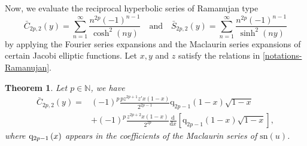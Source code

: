 \documentclass[11pt]{article}
\theoremstyle{plain}
\newtheorem{thm}{Theorem}[section]
\theoremstyle{definition}
\begin{document}
Now, we evaluate the  reciprocal hyperbolic series of Ramanujan type
$$
\bar{C}_{2p,2}\left( y \right)=\sum_{n=1}^{\infty}{\frac{n^{2p}\left( -1 \right) ^{n-1}}{\cosh ^2\left( ny \right)}}\quad\text{and}\quad\bar{S}_{2p,2}\left( y \right) =\sum_{n=1}^{\infty}{\frac{n^{2p}\left( -1 \right) ^{n-1}}{\sinh ^2\left( ny \right)}}
$$
by applying the Fourier series expansions and the Maclaurin series expansions of certain Jacobi elliptic functions. Let $x,y$ and $z$ satisfy the relations in \eqref{notations-Ramanujan}.

\begin{thm}\label{barC2p,2}
Let $p\in \mathbb{N}$, we have
\begin{align}
\bar{C}_{2p,2}\left( y \right)=&\left( -1 \right) ^p\frac{pz^{2p+1}z'x(1-x)}{2^{2p-1}}\mathrm{q}_{2p-1}\left( 1-x \right) \sqrt{1-x}\nonumber\\
& +\left( -1 \right) ^p\frac{z^{2p+2}x(1-x)}{2^{2p}}\frac{\mathrm{d}}{\mathrm{d}x}\left[ \mathrm{q}_{2p-1}\left( 1-x \right) \sqrt{1-x} \right],
\end{align}
where ${\rm q}_{2p-1}\left( x \right)$ appears in the coefficients of the Maclaurin series of $\mathrm{sn}\left( u \right)$.
\end{thm}
\end{document}
